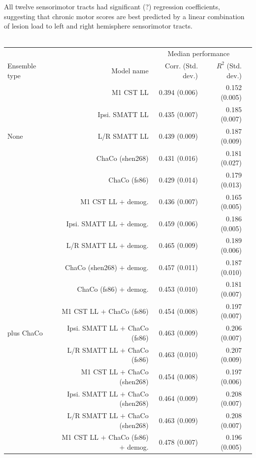 \documentclass[10pt]{article}
\def\Plus{\texttt{+}}
\begin{document}
All twelve sensorimotor tracts had significant (?) regression coefficients, suggesting that chronic motor scores are best predicted by a linear combination of lesion load to left and right hemisphere sensorimotor tracts. 
\\
\\
\begin{table}[h]
\centering
\label{table:5}
\begin{tabular}{lrrrr}
\toprule
 &  & \multicolumn{2}{c}{Median performance} \\
Ensemble type &  Model name & Corr. (Std. dev.) & $R^2$ (Std. dev.) \\
\midrule
\multirow[t]{5}{*}{None} & M1 CST LL & 0.394 (0.006) & 0.152 (0.005) \\
 & Ipsi. SMATT LL & 0.435 (0.007) & 0.185 (0.007) \\
 & L/R SMATT LL & 0.439 (0.009) & 0.187 (0.009) \\
 & ChaCo (shen268) & 0.431 (0.016) & 0.181 (0.027) \\
 & ChaCo (fs86) & 0.429 (0.014) & 0.179 (0.013) \\
 \arrayrulecolor{black!30}\midrule
\multirow[t]{5}{*}{Demographics} & M1 CST LL $\Plus$ demog. & 0.436 (0.007) & 0.165 (0.005) \\
 & Ipsi. SMATT LL $\Plus$ demog. & 0.459 (0.006) & 0.186 (0.005) \\
 & L/R SMATT LL $\Plus$ demog. & 0.465 (0.009) & 0.189 (0.006) \\
 & ChaCo (shen268) $\Plus$ demog. & 0.457 (0.011) & 0.187 (0.010) \\
 & ChaCo (fs86) $\Plus$ demog. & 0.453 (0.010) & 0.181 (0.007) \\
 \arrayrulecolor{black!30}\midrule
\multirow[t]{6}{*}{Lesion load} & M1 CST LL $\Plus$ ChaCo (fs86) & 0.454 (0.008) & 0.197 (0.007) \\
 plus ChaCo & Ipsi. SMATT LL $\Plus$ ChaCo (fs86) & 0.463 (0.009) & 0.206 (0.007) \\
 & L/R SMATT LL $\Plus$ ChaCo (fs86) & 0.463 (0.010) & 0.207 (0.009) \\
 & M1 CST LL $\Plus$ ChaCo (shen268) & 0.454 (0.008) & 0.197 (0.006) \\
 & Ipsi. SMATT LL $\Plus$ ChaCo (shen268) & 0.464 (0.009) & 0.208 (0.007) \\
 & L/R SMATT LL $\Plus$ ChaCo (shen268) & 0.463 (0.009) & 0.208 (0.007) \\
 \arrayrulecolor{black!30}\midrule
\multirow[t]{6}{*}{Lesion load}  & M1 CST LL $\Plus$ ChaCo  (fs86) $\Plus$ demog. & 0.478 (0.007) & 0.196 (0.005) \\

\end{tabular}
\end{table}
\end{document}
